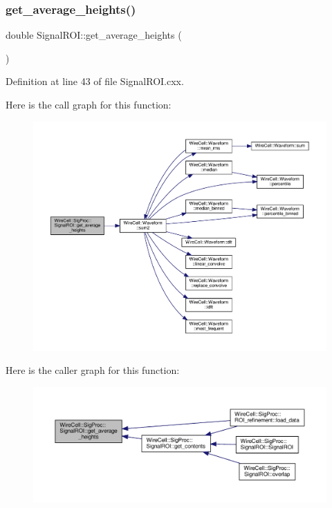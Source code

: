 \subsubsection{\texorpdfstring{get\+\_\+average\+\_\+heights()}{get\_average\_heights()}}
{\footnotesize\ttfamily double Signal\+R\+O\+I\+::get\+\_\+average\+\_\+heights (\begin{DoxyParamCaption}{ }\end{DoxyParamCaption})}



Definition at line 43 of file Signal\+R\+O\+I.\+cxx.

Here is the call graph for this function\+:
\nopagebreak
\begin{figure}[H]
\begin{center}
\leavevmode
\includegraphics[width=350pt]{class_wire_cell_1_1_sig_proc_1_1_signal_r_o_i_aed20acd4564c60d6ebfc1d0c0b3c27b6_cgraph}
\end{center}
\end{figure}
Here is the caller graph for this function\+:
\nopagebreak
\begin{figure}[H]
\begin{center}
\leavevmode
\includegraphics[width=350pt]{class_wire_cell_1_1_sig_proc_1_1_signal_r_o_i_aed20acd4564c60d6ebfc1d0c0b3c27b6_icgraph}
\end{center}
\end{figure}
\mbox{\label{class_wire_cell_1_1_sig_proc_1_1_signal_r_o_i_a92565abca22adcc336111be6f487f9c9}} 
